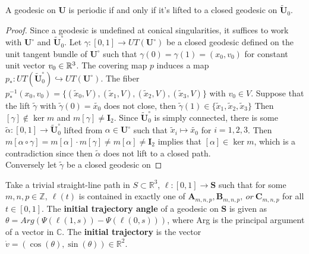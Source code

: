 \documentclass[]{article}
\def\bU{\mathbf{U}} \def\btU{\tilde{\bU}} \def\bUs{\bU^\circ}
\def\btUos{\btU_0^\circ}
\begin{document}
\begin{lem}
A geodesic on $\bU$ is periodic if and only if it's lifted to a closed geodesic on $\btU_0$.
\begin{proof}

Since a geodesic is undefined at conical singularities, it suffices to work with $\bUs$ and $\btU_0^\circ$. Let $\gamma:[0,1]\rightarrow UT(\bUs)$ be a closed geodesic defined on the unit tangent bundle of $\bUs$ such that $\gamma(0)=\gamma(1)=(x_0,v_0)$ for constant unit vector $v_0\in\mathbb{R}^3$. The covering map $p$ induces a map $p_*:UT(\btUos)\hookrightarrow UT(\bUs)$. The fiber $p_*^{-1}(x_0,v_0)=\{(\tilde{x}_0,V),(\tilde{x}_1,V),(\tilde{x}_2,V),(\tilde{x}_3,V)\}$ with $v_0\in V$. Suppose that the lift $\tilde{\gamma}$ with $\tilde{\gamma}(0)=\tilde{x_0}$ does not close, then $\tilde{\gamma}(1)\in\{\tilde{x}_1,\tilde{x}_2,\tilde{x}_3\}$ Then $[\gamma]\notin\ker m$ and $m[\gamma]\neq \mathbf{I}_2$. Since $\btUos$ is simply connected, there is some $\tilde{\alpha}:[0,1]\rightarrow \btUos$ lifted from $\alpha\in\bUs$ such that $\tilde{x}_i\mapsto\tilde{x_0}$ for $i=1,2,3$. Then $m[\alpha\circ\gamma]=m[\alpha]\cdot m[\gamma]\neq m[\alpha]\neq \mathbf{I}_2$ implies that $[\alpha]\in \ker m$, which is a contradiction since then $\tilde{\alpha}$ does not lift to a closed path.\\
Conversely let $\tilde{\gamma}$ be a closed geodesic on 
\end{proof}
\end{lem}



\newpage

\begin{Def}
Take a trivial straight-line path in $S\subset\mathbb{R}^3$, $\ell:[0,1]\rightarrow\mathbf{S}$ such that for some $m,n,p\in\mathbb{Z},~ \ell(t)$ is contained in exactly one of $\mathbf{A}_{m,n,p},\mathbf{B}_{m,n,p},~or~\mathbf{C}_{m,n,p}$ for all $t\in[0,1]$. The \textbf{initial trajectory angle} of a geodesic on $\mathbf{S}$ is given as $\theta=Arg(\Psi(\ell(1,s))-\Psi(\ell(0,s)))$, where Arg is the principal argument of a vector in $\mathbb{C}$. The \textbf{initial trajectory} is the vector $\dot{v}=(\cos(\theta),\sin(\theta))\in\mathbb{R}^2$.\\
\begin{figure}[H]
\centering

\end{figure}
\end{Def}
\end{document}
